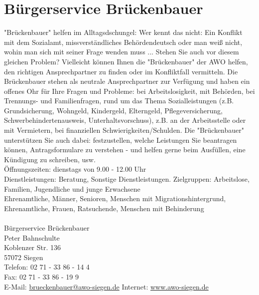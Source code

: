 \section{Bürgerservice Brückenbauer}
"Brückenbauer" helfen im Alltagsdschungel: Wer kennt das nicht: Ein Konflikt mit dem Sozialamt, missverständliches Behördendeutsch oder man weiß nicht, wohin man sich mit seiner Frage wenden muss ... Stehen Sie auch vor diesem gleichen Problem? Vielleicht können Ihnen die "Brückenbauer" der AWO helfen, den richtigen Ansprechpartner zu finden oder im Konfliktfall vermitteln. Die Brückenbauer stehen als neutrale Ansprechpartner zur Verfügung und haben ein offenes Ohr für Ihre Fragen und Probleme:  bei 
Arbeitslosigkeit, mit Behörden, bei Trennungs- und Familienfragen, rund um das Thema Sozialleistungen (z.B. Grundsicherung, 
Wohngeld, Kindergeld, Elterngeld, Pflegeversicherung, Schwerbehindertenausweis, Unterhaltsvorschuss), z.B. an der Arbeitsstelle oder mit Vermietern, bei finanziellen Schwierigkeiten/Schulden. Die "Brückenbauer" unterstützen Sie auch dabei: festzustellen, welche Leistungen Sie beantragen können, Antragsformulare zu verstehen - und helfen gerne beim Ausfüllen, eine Kündigung zu schreiben, usw. \\
Öffnungszeiten: dienstags von 9.00 - 12.00 Uhr \\
Dienstleistungen: Beratung, Sonstige Dienstleistungen. Zielgruppen: Arbeitslose, Familien, Jugendliche und junge Erwachsene\\ Ehrenamtliche, Männer, Senioren, Menschen mit Migrationshintergrund, Ehrenamtliche, Frauen, Ratsuchende, Menschen mit Behinderung\\ 
\\
Bürgerservice Brückenbauer \\
Peter Bahnschulte \\
Koblenzer Str. 136\\
57072 Siegen \\
Telefon: 02 71 - 33 86 - 14 4 \\
Fax: 02 71 - 33 86 - 19 9 \\ 
E-Mail: \href{mailto:brueckenbauer@awo-siegen.de}{brueckenbauer@awo-siegen.de}
Internet: \href{www.awo-siegen.de}{www.awo-siegen.de}  
